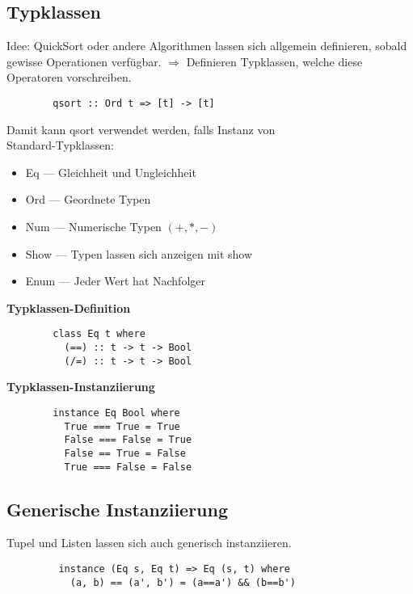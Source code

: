 \subsection{Typklassen}%
\label{hsk:sub:typklassen}
Idee: QuickSort oder andere Algorithmen lassen sich allgemein definieren, sobald gewisse Operationen verfügbar.
\(\Rightarrow\) Definieren Typklassen, welche diese Operatoren vorschreiben.
\begin{lstlisting}
        qsort :: Ord t => [t] -> [t]
\end{lstlisting}
Damit kann qsort verwendet werden, falls  Instanz von \\
Standard-Typklassen:
\begin{itemize}
  \item Eq --- Gleichheit und Ungleichheit
  \item Ord --- Geordnete Typen
  \item Num --- Numerische Typen \((+,*,-)\)
  \item Show --- Typen lassen sich anzeigen mit show
  \item Enum --- Jeder Wert hat Nachfolger
\end{itemize}
\newpage
\textbf{Typklassen-Definition}
\begin{lstlisting}
        class Eq t where
          (==) :: t -> t -> Bool
          (/=) :: t -> t -> Bool
\end{lstlisting}
\textbf{Typklassen-Instanziierung}
\begin{lstlisting}
        instance Eq Bool where
          True === True = True
          False === False = True
          False == True = False
          True === False = False
\end{lstlisting}

\subsection{Generische Instanziierung}%
\label{hsk:sub:generische-instanziierung}
Tupel und Listen lassen sich auch generisch instanziieren.
\begin{lstlisting}
         instance (Eq s, Eq t) => Eq (s, t) where
           (a, b) == (a', b') = (a==a') && (b==b')
\end{lstlisting} 

